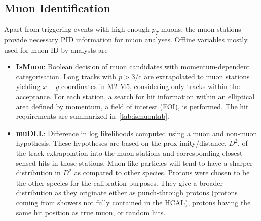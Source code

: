 \subsection{Muon Identification }
\label{muonID}
Apart from triggering events with high enough $p_{T}$ muons, the muon stations provide necessary \gls{PID} information for muon analyses. Offline variables mostly used for muon ID by analysts are
 \begin{itemize} 
	\DIFdelbegin %
\DIFdelend \DIFaddbegin \item{\textbf{IsMuon}: Boolean decision of muon candidates with momentum-dependent categorisation. Long tracks with $p>3$\gev/c are extrapolated to muon stations yielding $x-y$ coordinates in M2-M5, considering only tracks within the acceptance. For each station, a search for hit information within an elliptical area defined by momentum, a field of interest (\Gls{FOI}), is performed. The hit requirements are summarized in~\autoref{tab:ismuontab}.}
	\item{\textbf{muDLL}: Difference in log likelihoods computed using a muon and non-muon hypothesis. These hypotheses are based on the prox imity/distance, $D^{2}$, of the track extrapolation into the muon stations and corresponding closest sensed hits in those stations. Muon-like particles will tend to have a sharper distribution in $D^{2}$ as compared to other species. Protons were chosen to be the other species for the calibration purposes. They give a broader distribution as they originate either as punch-through protons (protons coming from showers not fully contained in the \gls{HCAL}), protons having the same hit position as true muon, or random hits.}

\end{itemize}
